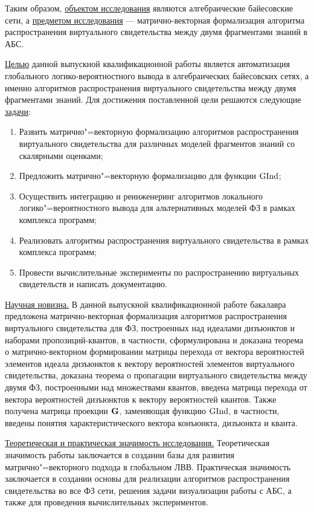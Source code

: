 Таким образом, \underline{объектом исследования} являются алгебраические байесовские сети,
а \underline{предметом исследования} --- матрично-векторная формализация алгоритма распространения виртуального свидетельства между двумя фрагментами знаний в АБС.

\underline{Целью} данной выпускной квалификационной работы является автоматизация глобального логико-вероятностного вывода в алгебраических
байесовских сетях, а именно алгоритмов распространения виртуального свидетельства между двумя фрагментами знаний. 
Для достижения поставленной цели решаются следующие \underline{задачи}:
\begin{enumerate}
        \item  Развить матрично"=векторную формализацию алгоритмов распространения виртуального свидетельства для различных моделей фрагментов знаний со скалярными оценками;
        \item Предложить матрично"=векторную формализацию для функции $\mathrm{GInd}$;
        \item Осуществить интеграцию и реинженеринг алгоритмов локального логико"=вероятностного вывода для альтернативных моделей ФЗ в рамках комплекса программ;
    \item Реализовать алгоритмы распространения виртуального свидетельства в рамках комплекса программ;
    \item Провести вычислительные эксперименты по распространению виртуальных свидетельств и написать документацию.
\end{enumerate}

\underline{Научная новизна.} 
В данной выпускной квалификационной работе бакалавра предложена матрично-векторная формализация алгоритмов распространения виртуального свидетельства для ФЗ, построенных над идеалами дизъюнктов и наборами пропозиций-квантов, в частности, сформулирована и доказана теорема о матрично-векторном формировании матрицы перехода от вектора вероятностей элементов идеала дизъюнктов к вектору вероятностей элементов виртуального свидетельства, доказана теорема о пропагации виртуального свидетельства между двумя ФЗ, построенными над множествами квантов, введена матрица перехода от вектора вероятностей дизъюнктов к вектору вероятностей квантов. Также получена матрица проекции $\mathbf{G}$, заменяющая функцию $\mathrm{GInd}$, в частности, введены понятия характеристического вектора конъюнкта, дизъюнкта и кванта. 

\underline{Теоретическая и практическая значимость исследования.} Теоретическая значимость работы заключается в создании базы для развития матрично"=векторного подхода в глобальном ЛВВ. Практическая значимость заключается в создании основы для реализации алгоритмов распространения свидетельства во все ФЗ сети, решения задачи визуализации работы с АБС, а также для проведения вычислительных экспериментов.


